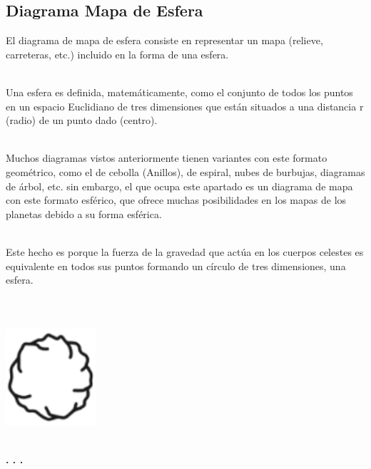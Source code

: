 \documentclass{article}\usepackage[]{graphicx}\usepackage[]{color}
\begin{document}
\subsection{Diagrama Mapa de Esfera}
El diagrama de mapa de esfera consiste en representar un mapa (relieve, carreteras, etc.) incluido en la forma de una esfera.~\\~\par
Una esfera es definida, matem\'aticamente, como el conjunto de todos los puntos en un espacio Euclidiano de tres dimensiones que est\'an situados a una distancia r (radio) de un punto dado (centro)\cite{math-sphere}.~\\~\par
Muchos diagramas vistos anteriormente tienen variantes con este formato geom\'etrico, como el de cebolla\cite{cebolla_cultura} (Anillos), de espiral\cite{tipos_espiral}, nubes de burbujas\cite{pack-book}, diagramas de \'arbol\cite{esfera-tree}, etc. sin embargo, el que ocupa este apartado es un diagrama de mapa con este formato esf\'erico, que ofrece muchas posibilidades en los mapas de los planetas debido a su forma esf\'erica.~\\~\par
Este hecho es porque la fuerza de la gravedad que act\'ua en los cuerpos celestes es equivalente en todos sus puntos formando un c\'irculo de tres dimensiones, una esfera. 
~\\~\\~\\~\\
\vbox{
    \centering
    \includegraphics[width=0.25\textwidth]{imag/esferas}
}
~\\~\\
\begin{center}
\textbf{. . .}
\end{center}
~\\~\\~\\
\end{document}
